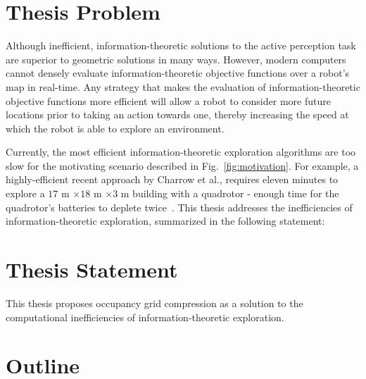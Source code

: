 \section{Thesis Problem}

Although inefficient, information-theoretic solutions to the active perception task
are superior to geometric solutions in many ways. However, modern computers cannot densely
evaluate information-theoretic objective functions over a robot's map in real-time.
Any strategy that makes the evaluation of information-theoretic objective functions more
efficient will allow a robot to consider more future locations prior to taking
an action towards one, thereby increasing the speed at which the robot is able
to explore an environment.

Currently, the most efficient information-theoretic exploration algorithms are
too slow for the motivating scenario described in
Fig.~\ref{fig:motivation}. For example, a highly-efficient recent approach
by Charrow et al., requires eleven minutes to explore a $17$ m $\times 18$ m $
\times 3$ m building with a quadrotor - enough time for the quadrotor's batteries to
deplete twice~\cite{charrow2015icra}. This thesis addresses the inefficiencies of information-theoretic exploration,
summarized in the following statement:

\begin{center}  \end{center}

\section{Thesis Statement}

This thesis proposes occupancy grid compression as a solution to
the computational inefficiencies of information-theoretic exploration.

\section{Outline}




